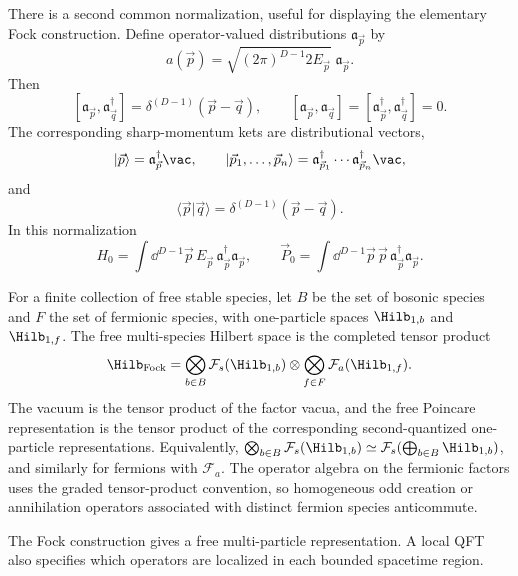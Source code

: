 \begin{definition}
\label{def:noncovariant-creation-momentum-ket-normalization}
There is a second common normalization, useful for displaying the elementary
Fock construction.  Define operator-valued distributions
\(\mathfrak a_{\vec p}\) by
\[
  a(\vec p)
  =
  \sqrt{(2\pi)^{D-1}2E_{\vec p}}\;\mathfrak a_{\vec p}.
\]
Then
\[
  [\mathfrak a_{\vec p},\mathfrak a_{\vec q}^{\dagger}]
  =
  \delta^{(D-1)}(\vec p-\vec q),
  \qquad
  [\mathfrak a_{\vec p},\mathfrak a_{\vec q}]=
  [\mathfrak a_{\vec p}^{\dagger},\mathfrak a_{\vec q}^{\dagger}]=0.
\]
The corresponding sharp-momentum kets are distributional vectors,
\[
  |\vec p\rangle=\mathfrak a_{\vec p}^{\dagger}\vac,
  \qquad
  |\vec p_1,\ldots,\vec p_n\rangle
  =
  \mathfrak a_{\vec p_1}^{\dagger}\cdots
  \mathfrak a_{\vec p_n}^{\dagger}\vac,
\]
and
\[
  \langle\vec p|\vec q\rangle=\delta^{(D-1)}(\vec p-\vec q).
\]
In this normalization
\[
  H_0=\int\dd^{D-1}\vec p\,
  E_{\vec p}\,\mathfrak a_{\vec p}^{\dagger}\mathfrak a_{\vec p},
  \qquad
  \vec P_0=\int\dd^{D-1}\vec p\,
  \vec p\,\mathfrak a_{\vec p}^{\dagger}\mathfrak a_{\vec p}.
\]
\end{definition}

\begin{definition}
\label{def:free-multi-species-fock-representation}
For a finite collection of free stable species, let \(B\) be the set of
bosonic species and \(F\) the set of fermionic species, with one-particle
spaces \(\Hilb_{1,b}\) and \(\Hilb_{1,f}\).  The free multi-species Hilbert
space is the completed tensor product
\[
  \Hilb_{\rm Fock}
  =
  \bigotimes_{b\in B}\mathcal F_s(\Hilb_{1,b})
  \otimes
  \bigotimes_{f\in F}\mathcal F_a(\Hilb_{1,f}) .
\]
The vacuum is the tensor product of the factor vacua, and the free Poincare
representation is the tensor product of the corresponding second-quantized
one-particle representations.  Equivalently,
\(\bigotimes_{b\in B}\mathcal F_s(\Hilb_{1,b})\simeq
\mathcal F_s(\bigoplus_{b\in B}\Hilb_{1,b})\), and similarly for fermions with
\(\mathcal F_a\).  The operator algebra on the fermionic factors uses the
graded tensor-product convention, so homogeneous odd creation or annihilation
operators associated with distinct fermion species anticommute.
\end{definition}

The Fock construction gives a free multi-particle representation. A local QFT
also specifies which operators are localized in each bounded spacetime region.

